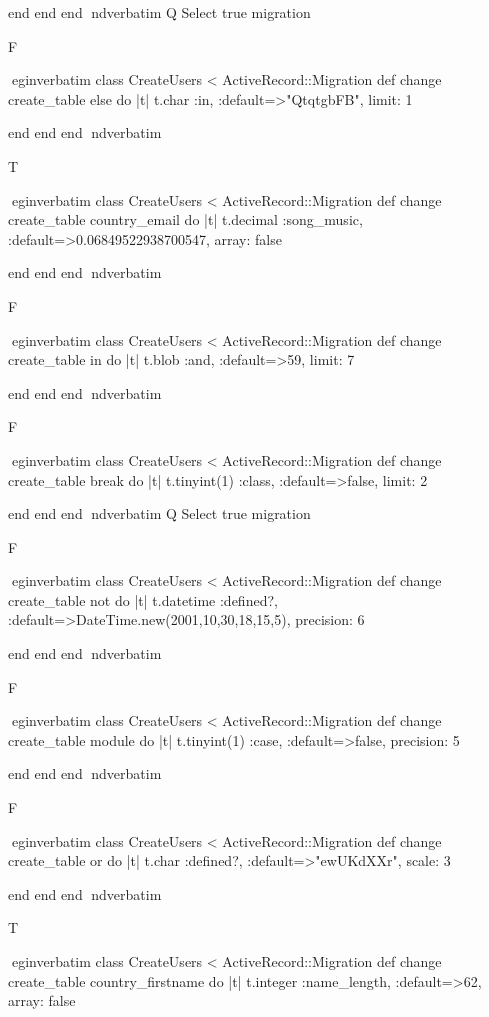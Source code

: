     end 
  end 
end
nd{verbatim}
Q
 Select true migration

F

egin{verbatim}
 class CreateUsers < ActiveRecord::Migration 
  def change 
    create_table else do |t| 
      t.char :in, :default=>"QtqtgbFB", limit: 1
    
    end 
  end 
end
nd{verbatim}

T

egin{verbatim}
 class CreateUsers < ActiveRecord::Migration 
  def change 
    create_table country_email do |t| 
      t.decimal :song_music, :default=>0.06849522938700547, array: false
    
    end 
  end 
end
nd{verbatim}

F

egin{verbatim}
 class CreateUsers < ActiveRecord::Migration 
  def change 
    create_table in do |t| 
      t.blob :and, :default=>59, limit: 7
    
    end 
  end 
end
nd{verbatim}

F

egin{verbatim}
 class CreateUsers < ActiveRecord::Migration 
  def change 
    create_table break do |t| 
      t.tinyint(1) :class, :default=>false, limit: 2
    
    end 
  end 
end
nd{verbatim}
Q
 Select true migration

F

egin{verbatim}
 class CreateUsers < ActiveRecord::Migration 
  def change 
    create_table not do |t| 
      t.datetime :defined?, :default=>DateTime.new(2001,10,30,18,15,5), precision: 6
    
    end 
  end 
end
nd{verbatim}

F

egin{verbatim}
 class CreateUsers < ActiveRecord::Migration 
  def change 
    create_table module do |t| 
      t.tinyint(1) :case, :default=>false, precision: 5
    
    end 
  end 
end
nd{verbatim}

F

egin{verbatim}
 class CreateUsers < ActiveRecord::Migration 
  def change 
    create_table or do |t| 
      t.char :defined?, :default=>"ewUKdXXr", scale: 3
    
    end 
  end 
end
nd{verbatim}

T

egin{verbatim}
 class CreateUsers < ActiveRecord::Migration 
  def change 
    create_table country_firstname do |t| 
      t.integer :name_length, :default=>62, array: false
    
